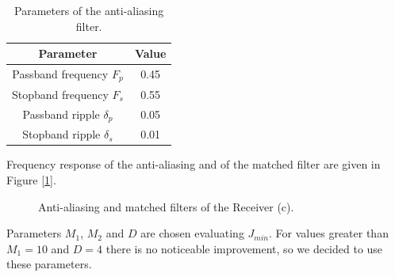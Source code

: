\documentclass[a4paper, 12pt]{report}
\begin{document}
\begin{table}[H]
	\centering
	\begin{tabular}{c | c}
		\toprule
		Parameter & Value \\
		\midrule
		Passband frequency $F_{p}$ & 0.45\\
		Stopband frequency $F_{s}$ & 0.55\\
		Passband ripple $\delta_{p}$ & 0.05\\
		Stopband ripple $\delta_{s}$ & 0.01\\
		\bottomrule			
	\end{tabular}
	\caption{Parameters of the anti-aliasing filter.}
	\label{gaa}
\end{table}
Frequency response of the anti-aliasing and of the matched filter are given in Figure [\ref{filters_c}].
\begin{figure}[H]
	\centering
	\caption{Anti-aliasing and matched filters of the Receiver (c).}\label{filters_c}
\end{figure}

Parameters $M_1$, $M_2$ and $D$ are chosen evaluating $J_{min}$. For values greater than $M_1=10$ and $D=4$ there is no noticeable improvement, so we decided to use these parameters.
\end{document}
